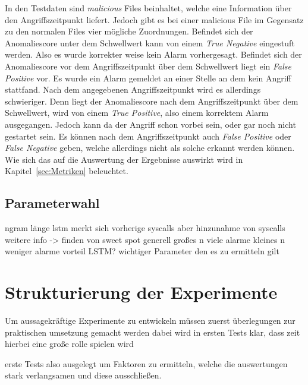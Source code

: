                 In den Testdaten sind \textit{malicious}  Files beinhaltet, welche eine Information über den Angriffszeitpunkt liefert. 
                Jedoch gibt es bei einer malicious File im Gegensatz zu den normalen Files  vier mögliche Zuordnungen.
                Befindet sich der Anomaliescore unter dem Schwellwert kann von einem \textit{True Negative} eingestuft werden.
                Also es wurde korrekter weise kein Alarm vorhergesagt.
                Befindet sich der Anomaliescore vor dem Angriffszeitpunkt über dem Schwellwert liegt ein \textit{False Positive} vor.
                Es wurde ein Alarm gemeldet an einer Stelle an dem kein Angriff stattfand.
                Nach dem angegebenen Angriffszeitpunkt wird es allerdings schwieriger.
                Denn liegt der Anomaliescore nach dem Angriffszeitpunkt über dem Schwellwert, wird von einem \textit{True Positive}, also einem korrektem Alarm ausgegangen.
                Jedoch kann da der Angriff schon vorbei sein, oder gar noch nicht gestartet sein.
                Es können nach dem Angriffszeitpunkt auch \textit{False Positive} oder \textit{False Negative} geben, welche allerdings nicht als solche erkannt werden können.
                Wie sich das auf die Auswertung der Ergebnisse auswirkt wird in Kapitel~\ref{sec:Metriken} beleuchtet.

        \subsection{Parameterwahl}
            ngram länge
            lstm merkt sich vorherige syscalls aber hinzunahme von syscalls weitere info
            -> finden von sweet spot
            generell großes n viele alarme
            kleines n weniger alarme  vorteil \ac{LSTM}\@?
            wichtiger Parameter den es zu ermitteln gilt

    \section{Strukturierung der Experimente}\label{sec:StrukExp}
        Um aussagekräftige Experimente zu entwickeln müssen zuerst 
        überlegungen zur praktischen umsetzung gemacht werden
        dabei wird in ersten Tests klar, dass zeit hierbei eine große rolle spielen wird

        erste Tests also ausgelegt um Faktoren zu ermitteln, welche die auswertungen stark verlangsamen
        und diese ausschließen.

